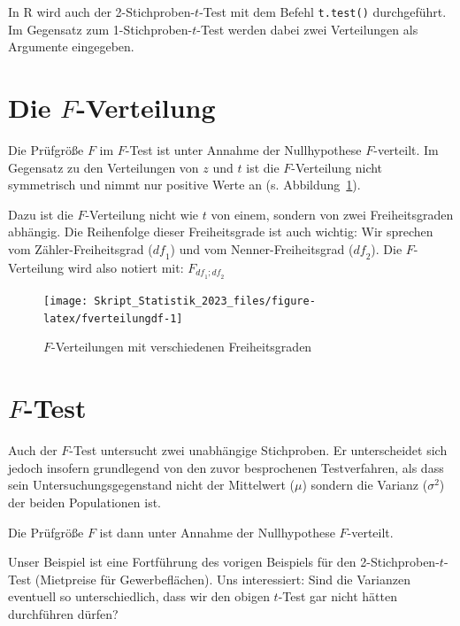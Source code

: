 \documentclass[
  11pt,
  ngerman,
  a4paper,
]{report}
\newenvironment{rtip}{
  \medskip
  \begin{tcolorbox}[colframe=purple,colback=light_gray,title=Softwarehinweis]
}{
  \end{tcolorbox}
  \medskip
}
\begin{document}
\begin{rtip}
In R wird auch der 2-Stichproben-$t$-Test mit dem Befehl \verb|t.test()| durchgeführt. Im Gegensatz zum 1-Stichproben-$t$-Test werden dabei zwei Verteilungen als Argumente eingegeben.
\end{rtip}

\hypertarget{die-f-verteilung}{%
\section{\texorpdfstring{Die \(F\)-Verteilung}{Die F-Verteilung}}\label{die-f-verteilung}}

Die Prüfgröße \(F\) im \(F\)-Test ist unter Annahme der Nullhypothese \(F\)-verteilt. Im Gegensatz zu den Verteilungen von \(z\) und \(t\) ist die \(F\)-Verteilung nicht symmetrisch und nimmt nur positive Werte an (s. Abbildung~\ref{fig:fverteilungdf}).

Dazu ist die \(F\)-Verteilung nicht wie \(t\) von einem, sondern von zwei Freiheitsgraden abhängig. Die Reihenfolge dieser Freiheitsgrade ist auch wichtig: Wir sprechen vom Zähler-Freiheitsgrad (\(\mathit{df}_1\)) und vom Nenner-Freiheitsgrad (\(\mathit{df}_2\)). Die \(F\)-Verteilung wird also notiert mit: \(F_{\mathit{df}_1;\mathit{df}_2}\)

\begin{figure}[!h]

{\centering \texttt{[image: Skript\_Statistik\_2023\_files/figure-latex/fverteilungdf-1]} 

}

\caption{$F$-Verteilungen mit verschiedenen Freiheitsgraden}\label{fig:fverteilungdf}
\end{figure}

\hypertarget{f-test}{%
\section{\texorpdfstring{\(F\)-Test}{F-Test}}\label{f-test}}

Auch der \(F\)-Test untersucht zwei unabhängige Stichproben. Er unterscheidet sich jedoch insofern grundlegend von den zuvor besprochenen Testverfahren, als dass sein Untersuchungsgegenstand nicht der Mittelwert (\(\mu\)) sondern die Varianz (\(\sigma^2\)) der beiden Populationen ist.

Die Prüfgröße \(F\) ist dann unter Annahme der Nullhypothese \(F\)-verteilt.

Unser Beispiel ist eine Fortführung des vorigen Beispiels für den 2-Stichproben-\(t\)-Test (Mietpreise für Gewerbeflächen). Uns interessiert: Sind die Varianzen eventuell so unterschiedlich, dass wir den obigen \(t\)-Test gar nicht hätten durchführen dürfen?
\end{document}
